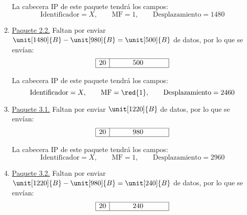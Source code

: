 \begin{ejemplo}
\begin{enumerate}
        La cabecera IP de este paquete tendrá los campos:
        \begin{equation*}
            \text{Identificador} = X,\qquad \text{MF} = 1,\qquad \text{Desplazamiento} = 1480
        \end{equation*}

        \item \ul{Paquete 2.2.} Faltan por enviar $\unit[1480]{B}-\unit[980]{B}=\unit[500]{B}$ de datos, por lo que se envían:
        \begin{equation*}
            \begin{array}{|c|c|}
                \hline 20 & \hspace{1cm} 500 \hspace{1cm}~\\ \hline
            \end{array}
        \end{equation*}

        La cabecera IP de este paquete tendrá los campos:
        \begin{equation*}
            \text{Identificador} = X,\qquad \text{MF} = \red{1},\qquad \text{Desplazamiento} = 2460
        \end{equation*}

        \item \ul{Paquete 3.1.} Faltan por enviar $\unit[1220]{B}$ de datos, por lo que se envían:
        \begin{equation*}
            \begin{array}{|c|c|}
                \hline 20 & \hspace{1cm} 980 \hspace{1cm}~\\ \hline
            \end{array}
        \end{equation*}

        La cabecera IP de este paquete tendrá los campos:
        \begin{equation*}
            \text{Identificador} = X,\qquad \text{MF} = 1,\qquad \text{Desplazamiento} = 2960
        \end{equation*}

        \item \ul{Paquete 3.2.} Faltan por enviar $\unit[1220]{B}-\unit[980]{B}=\unit[240]{B}$ de datos, por lo que se envían:
        \begin{equation*}
            \begin{array}{|c|c|}
                \hline 20 & \hspace{1cm} 240 \hspace{1cm}~\\ \hline
            \end{array}
        \end{equation*}


\end{enumerate}
\end{ejemplo}
